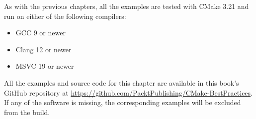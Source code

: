 As with the previous chapters, all the examples are tested with CMake 3.21 and run on either of the following compilers:

\begin{itemize}
\item 
GCC 9 or newer

\item 
Clang 12 or newer

\item 
MSVC 19 or newer
\end{itemize}

All the examples and source code for this chapter are available in this book's GitHub repository at \url{https://github.com/PacktPublishing/CMake-BestPractices}. If any of the software is missing, the corresponding examples will be excluded from the build. 










